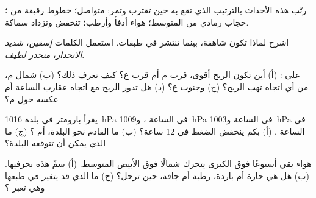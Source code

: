 \begin{exercise}[$\star\star$]\label{exo:g8:fronts-and-weather-maps:5}
رتّب هذه الأحداث بالترتيب الذي تقع به حين تقترب  وتمر: 
متواصل؛ خطوط رقيقة من ؛ حجاب رمادي من  المتوسط؛ هواء أدفأ
وأرطب؛  تنخفض وتزداد سماكة.
\end{exercise}

\begin{exercise}[$\star\star$]\label{exo:g8:fronts-and-weather-maps:6}
اشرح لماذا تكون   شاهقة، بينما تنتشر   في
طبقات. استعمل الكلمات \emph{إسفين}،
\emph{شديد الانحدار}، \emph{منحدر لطيف}.
\end{exercise}

\begin{exercise}[$\star\star$]\label{exo:g8:fronts-and-weather-maps:7}
على  : (أ) أين تكون الريح أقوى، قرب م أم قرب ع؟
كيف تعرف ذلك؟ (ب) شمال م، من أي اتجاه تهب الريح؟
(ج) وجنوب ع؟ (د) هل تدور الريح مع اتجاه عقارب الساعة أم عكسه
حول م؟
\end{exercise}

\begin{exercise}[$\star\star$]\label{exo:g8:fronts-and-weather-maps:8}
يقرأ بارومتر في بلدة \qty{1016}{hPa} في الساعة ، و\qty{1009}{hPa} في الساعة
 و\qty{1003}{hPa} في الساعة . (أ) بكم ينخفض الضغط
في 12 ساعة؟ (ب) ما القادم نحو البلدة،  أم
؟ (ج) ما  الذي يمكن أن تتوقعه البلدة؟
\end{exercise}

\begin{exercise}[$\star\star$]\label{exo:g8:fronts-and-weather-maps:9}
هواء بقي أسبوعًا فوق  الكبرى يتحرك شمالًا فوق  الأبيض
المتوسط. (أ) سمِّ هذه  بحرفيها. (ب) هل هي
حارة أم باردة، رطبة أم جافة، حين ترحل؟ (ج) ما الذي قد يتغير في
طبعها وهي تعبر ؟
\end{exercise}


